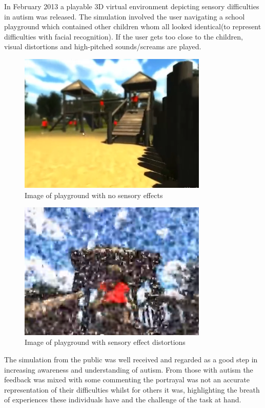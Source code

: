 \documentclass[11pt]{report}
\begin{document}
In February 2013 a playable 3D virtual environment depicting sensory difficulties in autism was released. The simulation involved the user navigating a school playground which contained other children whom all looked identical(to represent difficulties with facial recognition). If the user gets too close to the children, visual distortions and high-pitched sounds/screams are played. 

\begin{figure}[H]
\centering
\includegraphics[width=90mm]{images/litreview/autisim1.png}
\caption{Image of playground with no sensory effects}
\label{autisim1}
\end{figure}

\begin{figure}[H]
\centering
\includegraphics[width=90mm]{images/litreview/autisim2.png}
\caption{Image of playground with sensory effect distortions}
\label{autisim2}
\end{figure}


The simulation from the public was well received and regarded as a good step in increasing awareness and understanding of autism. From those with autism the feedback was mixed with some commenting the portrayal was not an accurate representation of their difficulties whilst for others it was, highlighting the breath of experiences these individuals have and the challenge of the task at hand.
\end{document}
